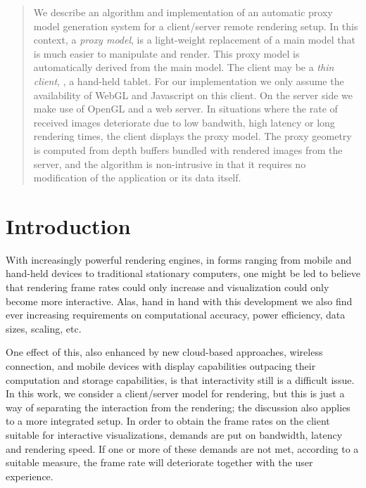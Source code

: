 \begin{abstract}
   We describe an algorithm and implementation of an automatic proxy model
   generation system for a client/server remote rendering setup. In this
   context, a {\em proxy model}, is a light-weight replacement of a main model
   that is much easier to manipulate and render. This proxy model is
   automatically derived from the main model. The client may be a {\em thin
   client}, \eg, a hand-held tablet. For our implementation we only assume the
   availability of WebGL and Javascript on this client. On the server side we
   make use of OpenGL and a web server. In situations where the rate of received
   images deteriorate due to low bandwith, high latency or long rendering times,
   the client displays the proxy model. The proxy geometry is computed from
   depth buffers bundled with rendered images from the server, and the algorithm
   is non-intrusive in that it requires no modification of the application or
   its data itself.

\begin{classification} %
\end{classification}

\end{abstract}




\section{Introduction}

With increasingly powerful rendering engines, in forms ranging from mobile and
hand-held devices to traditional stationary computers, one might be led to
believe that rendering frame rates could only increase and visualization could
only become more interactive. Alas, hand in hand with this development we also
find ever increasing requirements on computational accuracy, power efficiency,
data sizes, scaling, etc.

One effect of this, also enhanced by new cloud-based approaches, wireless
connection, and mobile devices with display capabilities outpacing their
computation and storage capabilities, is that interactivity still is a difficult
issue. In this work, we consider a client/server model for rendering, but this
is just a way of separating the interaction from the rendering; the discussion
also applies to a more integrated setup.  In order to obtain the frame rates on
the client suitable for interactive visualizations, demands are put on
bandwidth, latency and rendering speed. If one or more of these demands are not
met, according to a suitable measure, the frame rate will deteriorate together
with the user experience.

